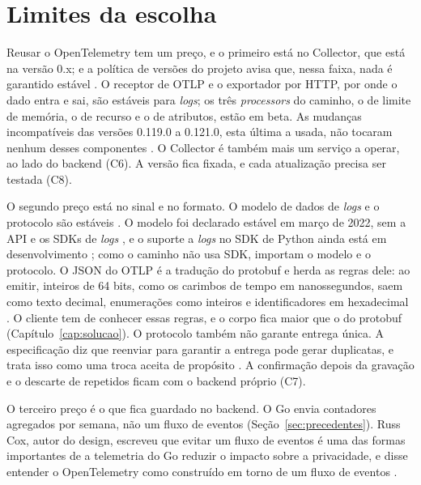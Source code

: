 

\section{Limites da escolha}
\label{sec:limites-otel}

Reusar o OpenTelemetry tem um preço, e o primeiro está no Collector, que está
na versão 0.x; e a política de versões do projeto avisa que, nessa faixa, nada
é garantido estável \citep{otel_collector_v0_121_0}. O receptor de OTLP e o
exportador por HTTP, por onde o dado entra e sai, são estáveis para
\textit{logs}; os três \textit{processors} do caminho, o de limite de memória,
o de recurso e o de atributos, estão em beta. As mudanças incompatíveis das
versões 0.119.0 a 0.121.0, esta última a usada, não tocaram nenhum desses
componentes \citep{otel_collector_v0_121_0}. O Collector é também mais um
serviço a operar, ao lado do backend (C6). A versão fica fixada, e cada
atualização precisa ser testada (C8).

O segundo preço está no sinal e no formato. O modelo de dados de \textit{logs}
e o protocolo são estáveis \citep{otel_logs_data_model, otlp_spec_1_11_1}. O
modelo foi declarado estável em março de 2022, sem a API e os SDKs de
\textit{logs} \citep{otel_spec_pr_2387}, e o suporte a \textit{logs} no SDK de
Python ainda está em desenvolvimento \citep{otel_python_docs}; como o caminho
não usa SDK, importam o modelo e o protocolo. O JSON do OTLP é a tradução do
protobuf e herda as regras dele: ao emitir, inteiros de 64 bits, como os
carimbos de tempo em nanossegundos, saem como texto decimal, enumerações como
inteiros e identificadores em hexadecimal \citep{otlp_spec_1_11_1}. O cliente
tem de conhecer essas regras, e o corpo fica maior que o do protobuf
(Capítulo~\ref{cap:solucao}). O protocolo também não garante entrega única. A
especificação diz que reenviar para garantir a entrega pode gerar duplicatas,
e trata isso como uma troca aceita de propósito \citep{otlp_spec_1_11_1}. A
confirmação depois da gravação e o descarte de repetidos ficam com o backend
próprio (C7).

O terceiro preço é o que fica guardado no backend. O Go envia contadores agregados
por semana, não um fluxo de eventos (Seção~\ref{sec:precedentes}). Russ Cox,
autor do design, escreveu que evitar um fluxo de eventos é uma das formas
importantes de a telemetria do Go reduzir o impacto sobre a privacidade, e
disse entender o OpenTelemetry como construído em torno de um fluxo de
eventos \citep{go_discussion_58409}.

